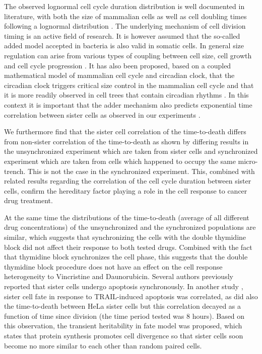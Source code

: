 \documentclass[pdftex,12pt,a4paper]{report}
\begin{document}
The observed lognormal cell cycle duration distribution is well documented in literature, with both the size of mammalian cells as well as cell doubling times following a lognormal distribution \cite{hosoda2011origin, paulus1975platelet}. The underlying mechanism of cell division timing is an active field of research. It is however assumed that the so-called added model accepted in bacteria \cite{campos2014constant} is also valid in somatic cells. In general size regulation can arise from various types of coupling between cell size, cell growth and cell cycle progression \cite{cadart2017size}. It has also been proposed, based on a coupled mathematical model of mammalian cell cycle and circadian clock, that the circadian clock triggers critical size control in the mammalian cell cycle and that it is more readily observed in cell trees that contain circadian rhythms \cite{zamborszky2007computational}. In this context it is important that the adder mechanism also predicts exponential time correlation between sister cells as observed in our experiments \cite{campos2014constant}.

We furthermore find that the sister cell correlation of the time-to-death differs from non-sister correlation of the time-to-death as shown by differing results in the unsynchronized experiment which are taken from sister cells and synchronized experiment which are taken from cells which happened to occupy the same micro-trench. This is not the case in the synchronized experiment. This, combined with related results regarding the correlation of the cell cycle duration between sister cells, confirm the hereditary factor playing a role in the cell response to cancer drug treatment.

At the same time the distributions of the time-to-death (average of all different drug concentrations) of the unsynchronized and the synchronized populations are similar, which suggests that synchronizing the cells with the double thymidine block did not affect their response to both tested drugs. Combined with the fact that thymidine block synchronizes the cell phase, this suggests that the double thymidine block procedure does not have an effect on the cell response heterogeneity to Vincristine and Daunorubicin. Several authors \cite{bhola2009determinism, rehm2009dynamics} previously reported that sister cells undergo apoptosis synchronously. In another study \cite{spencer2009non}, sister cell fate in response to TRAIL-induced apoptosis was correlated, as did also the time-to-death between HeLa sister cells but this correlation decayed as a function of time since division (the time period tested was 8 hours). Based on this observation, the transient heritability in fate model was proposed, which states that protein synthesis promotes cell divergence so that sister cells soon become no more similar to each other than random paired cells.
\end{document}
